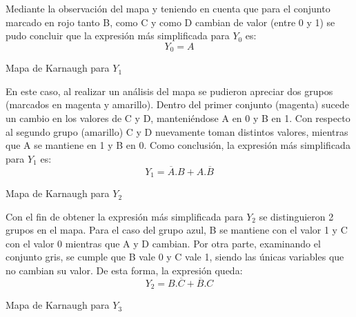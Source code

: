 \noindent
Mediante la observaci\'on del mapa y teniendo en cuenta que para el conjunto marcado en rojo tanto B, como C y como D cambian de valor (entre 0 y 1) se pudo concluir que la expresi\'on m\'as simplificada para $Y_0$ es:
\begin{equation}
    Y_0 = A
    \label{ecy0}
\end{equation}

\begin{center}
Mapa de Karnaugh para $Y_1$

\begin{Karnaugh4}
    \centering
\end{Karnaugh4}
\end{center}

\noindent
En este caso, al realizar un an\'alisis del mapa se pudieron apreciar dos grupos (marcados en magenta y amarillo). Dentro del primer conjunto (magenta) sucede un cambio en los valores de C y D, manteni\'endose A en 0 y B en 1. Con respecto al segundo grupo (amarillo) C y D nuevamente toman distintos valores, mientras que A se mantiene en 1 y B en 0. Como conclusi\'on, la expresi\'on m\'as simplificada para $Y_1$ es: 
\begin{equation}
    Y_1 = \overline{A}.B
 + A.\overline{B}
 \label{ecy1}
\end{equation}

\begin{center}
Mapa de Karnaugh para $Y_2$

\begin{Karnaugh4}
    \centering
\end{Karnaugh4}
\end{center}

\noindent
Con el fin de obtener la expresi\'on m\'as simplificada para $Y_2$ se distinguieron 2 grupos en el mapa. Para el caso del grupo azul, B se mantiene con el valor 1 y C con el valor 0 mientras que A y D cambian. Por otra parte, examinando el conjunto gris, se cumple que B vale 0 y C vale 1, siendo las \'unicas variables que no cambian su valor. De esta forma, la expresi\'on queda:
\begin{equation}
    Y_2 = B.\overline{C}
 + \overline{B}.C
 \label{ecy2}
\end{equation}
\begin{center}
Mapa de Karnaugh para $Y_3$

\begin{Karnaugh4}
    \centering
\end{Karnaugh4}
\end{center}
\noindent

